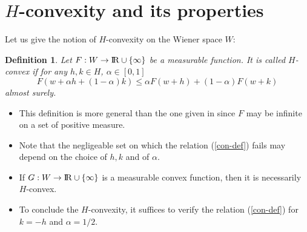 \documentclass[12pt,a4paper]{book}
\newtheorem{definition}[theorem]{Definition}
\newcommand{\reals}{{\rm I\!R}}
\newcommand{\al}{{\alpha}}
\newcommand{\remarks}{\noindent {\bf Remarks:\ }}
\begin{document}

\section{$H$-convexity and its properties}
Let us give  the notion of $H$-convexity on the  Wiener space $W$:
\begin{definition}
Let  $F:W\to \reals\cup\{\infty\}$ be a measurable function.
It is called $H$-convex if for any
$h,k\in H$, $\al\in [0,1]$
\begin{equation}
\label{con-def}
F(w+\al h+(1-\al)k)\leq \al F(w+h)+(1-\al)F(w+k)
\end{equation}
almost surely.
\end{definition}
\remarks
\begin{itemize}
\item This definition is more general than the one given in
  \cite{UZ0,UZ7} since $F$ may be   infinite on a set of  positive
  measure.
\item Note that the negligeable  set on which the relation
  (\ref{con-def}) fails may depend on the choice of $h,k$ and of $\al$.
\item If $G:W\to\reals\cup\{\infty\}$ is a measurable  convex
function, then it is  necessarily $H$-convex.
\item To conclude the $H$-convexity, it suffices to verify the
  relation (\ref{con-def}) for $k=-h$ and $\alpha=1/2$.
\end{itemize}
\end{document}
